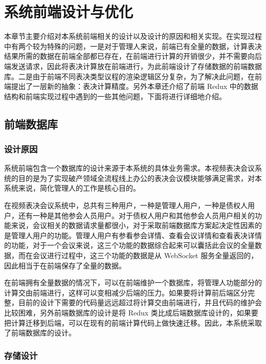 
\chapter{系统前端设计与优化}
本章节主要介绍对本系统前端相关的设计以及设计的原因和相关实现。在实现过程中有两个较为特殊的问题，一是对于管理人来说，前端已有全量的数据，计算表决结果所需的数据在前端全部都已存在，在前端进行计算的开销很少，并不需要向后端发送请求，因此将表决计算放在前端进行，为此前端设计了存储数据的前端数据库。二是由于前端不同表决类型议程的渲染逻辑区分复杂，为了解决此问题，在前端提出了一层新的抽象：表决计算精度。另外本章还介绍了前端 Redux 中的数据结构和前端实现过程中遇到的一些其他问题，下面将进行详细地介绍。

\section{前端数据库}

\subsection{设计原因}

系统前端包含一个数据库的设计来源于本系统的具体业务需求。本视频表决会议系统的目的是为了实现破产领域全流程线上办公的表决会议模块能够满足需求，对本系统来说，简化管理人的工作是核心目的。

在视频表决会议系统中，总共有三种用户，一种是管理人用户，一种是债权人用户，还有一种是其他参会人员用户。对于债权人用户和其他参会人员用户相关的功能来说，会议相关的数据请求量都很小，对于采取前端数据库方案起决定性因素的是管理人用户的功能。管理人用户有参看参会详情、查看会议详情和查看表决详情的功能，对于一个会议来说，这三个功能的数据综合起来可以囊括此会议的全量数据，而在会议进行过程中，这三个功能的数据是从 WebSocket 服务全量返回的，因此相当于在前端保存了全量的数据。

在前端拥有全量数据的情况下，可以在前端维护一个数据库，将管理人功能部分的计算交由前端进行，这样可以变相减少后端的压力。如果要将计算前后端区分完整，目前的设计下需要的代码量远远超过将计算交由前端进行，并且代码的维护会比较困难，另外前端数据库的设计是将 Redux 类比成后端数据库设计的，如果要把计算迁移到后端，可以在现有的前端计算代码上做快速迁移。因此，本系统采取了前端数据库的设计。

\subsection{存储设计}

